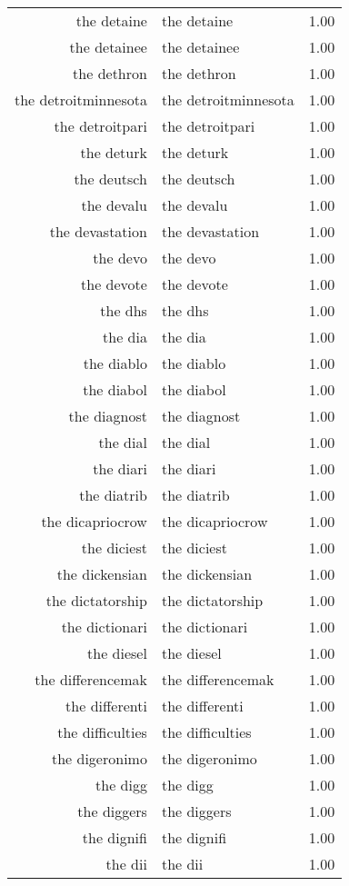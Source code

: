 \begin{table}[ht]
\begin{tabular}{rlr}
  the detaine & the detaine & 1.00 \\ 
  the detainee & the detainee & 1.00 \\ 
  the dethron & the dethron & 1.00 \\ 
  the detroitminnesota & the detroitminnesota & 1.00 \\ 
  the detroitpari & the detroitpari & 1.00 \\ 
  the deturk & the deturk & 1.00 \\ 
  the deutsch & the deutsch & 1.00 \\ 
  the devalu & the devalu & 1.00 \\ 
  the devastation & the devastation & 1.00 \\ 
  the devo & the devo & 1.00 \\ 
  the devote & the devote & 1.00 \\ 
  the dhs & the dhs & 1.00 \\ 
  the dia & the dia & 1.00 \\ 
  the diablo & the diablo & 1.00 \\ 
  the diabol & the diabol & 1.00 \\ 
  the diagnost & the diagnost & 1.00 \\ 
  the dial & the dial & 1.00 \\ 
  the diari & the diari & 1.00 \\ 
  the diatrib & the diatrib & 1.00 \\ 
  the dicapriocrow & the dicapriocrow & 1.00 \\ 
  the diciest & the diciest & 1.00 \\ 
  the dickensian & the dickensian & 1.00 \\ 
  the dictatorship & the dictatorship & 1.00 \\ 
  the dictionari & the dictionari & 1.00 \\ 
  the diesel & the diesel & 1.00 \\ 
  the differencemak & the differencemak & 1.00 \\ 
  the differenti & the differenti & 1.00 \\ 
  the difficulties & the difficulties & 1.00 \\ 
  the digeronimo & the digeronimo & 1.00 \\ 
  the digg & the digg & 1.00 \\ 
  the diggers & the diggers & 1.00 \\ 
  the dignifi & the dignifi & 1.00 \\ 
  the dii & the dii & 1.00 \\ 

\end{tabular}
\end{table}
